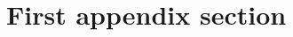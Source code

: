 \documentclass[twocolumn,astrosymb,tighten,twocolappendix,longbib,trackchanges]{aastex7} %
\begin{document}





{}

\clearpage
\appendix





\section{First appendix section}\label{appsec:app}
\end{document}
